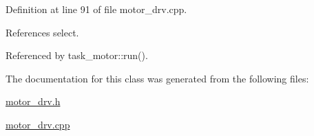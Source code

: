 Definition at line 91 of file motor\-\_\-drv.\-cpp.



References select.



Referenced by task\-\_\-motor\-::run().



The documentation for this class was generated from the following files\-:\begin{DoxyCompactItemize}
\item 
\hyperlink{motor__drv_8h}{motor\-\_\-drv.\-h}\item 
\hyperlink{motor__drv_8cpp}{motor\-\_\-drv.\-cpp}\end{DoxyCompactItemize}
